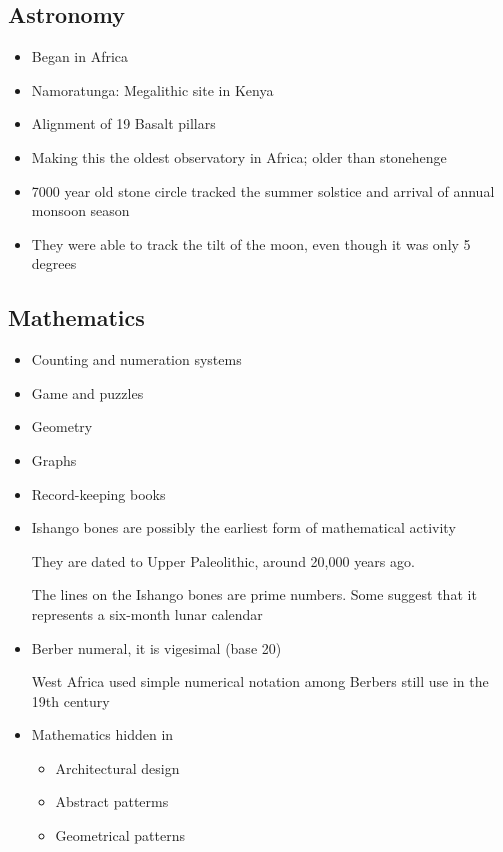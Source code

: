 \documentclass{article}
\begin{document}
\subsection{Astronomy}
\begin{itemize}
  \item Began in Africa
  \item Namoratunga: Megalithic site in Kenya
  \item Alignment of 19 Basalt pillars
  \item Making this the oldest observatory in Africa;
    older than stonehenge
  \item 7000 year old stone circle tracked the summer solstice and arrival of annual monsoon season
  \item They were able to track the tilt of the moon, even though it was only 5 degrees
\end{itemize}


\subsection{Mathematics}
\begin{itemize}
  \item Counting and numeration systems
  \item Game and puzzles
  \item Geometry
  \item Graphs
  \item Record-keeping books
  \item Ishango bones are possibly the earliest form of mathematical activity

  They are dated to Upper Paleolithic, around 20,000 years ago.

  The lines on the Ishango bones are prime numbers.
  Some suggest that it represents a six-month lunar calendar
\item Berber numeral, it is vigesimal (base 20)

  West Africa used simple numerical notation among Berbers still use in the 19th century
\item Mathematics hidden in
  \begin{itemize}
    \item Architectural design
    \item Abstract patterms
    \item Geometrical patterns
  \end{itemize}
\end{itemize}
\end{document}
